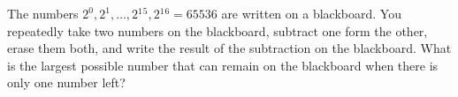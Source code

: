 The numbers $2^0, 2^1, \dots , 2{}^1{}^5, 2{}^1{}^6 = 65536$ are written on a blackboard. You repeatedly take two numbers on the blackboard, subtract one form the other, erase them both, and write the result of the subtraction on the blackboard. What is the largest possible number that can remain on the blackboard when there is only one number left?